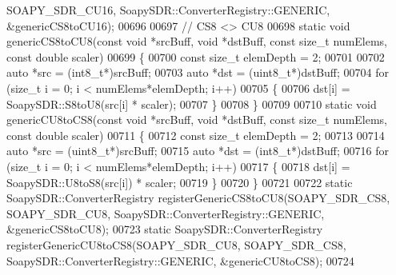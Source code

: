 \begin{DoxyCode}
      SOAPY_SDR_CU16, SoapySDR::ConverterRegistry::GENERIC, &genericCS8toCU16);
00696 
00697 \textcolor{comment}{// CS8 <> CU8}
00698 \textcolor{keyword}{static} \textcolor{keywordtype}{void} genericCS8toCU8(\textcolor{keyword}{const} \textcolor{keywordtype}{void} *srcBuff, \textcolor{keywordtype}{void} *dstBuff, \textcolor{keyword}{const} \textcolor{keywordtype}{size\_t} numElems, \textcolor{keyword}{const} \textcolor{keywordtype}{double} scaler)
00699 \{
00700   \textcolor{keyword}{const} \textcolor{keywordtype}{size\_t} elemDepth = 2;
00701 
00702   \textcolor{keyword}{auto} *src = (int8\_t*)srcBuff;
00703   \textcolor{keyword}{auto} *dst = (uint8\_t*)dstBuff;
00704   \textcolor{keywordflow}{for} (\textcolor{keywordtype}{size\_t} i = 0; i < numElems*elemDepth; i++)
00705     \{
00706       dst[i] = SoapySDR::S8toU8(src[i] * scaler);
00707     \}
00708 \}
00709 
00710 \textcolor{keyword}{static} \textcolor{keywordtype}{void} genericCU8toCS8(\textcolor{keyword}{const} \textcolor{keywordtype}{void} *srcBuff, \textcolor{keywordtype}{void} *dstBuff, \textcolor{keyword}{const} \textcolor{keywordtype}{size\_t} numElems, \textcolor{keyword}{const} \textcolor{keywordtype}{double} scaler)
00711 \{
00712   \textcolor{keyword}{const} \textcolor{keywordtype}{size\_t} elemDepth = 2;
00713 
00714   \textcolor{keyword}{auto} *src = (uint8\_t*)srcBuff;
00715   \textcolor{keyword}{auto} *dst = (int8\_t*)dstBuff;
00716   \textcolor{keywordflow}{for} (\textcolor{keywordtype}{size\_t} i = 0; i < numElems*elemDepth; i++)
00717     \{
00718       dst[i] = SoapySDR::U8toS8(src[i]) * scaler;
00719     \}
00720 \}
00721 
00722 \textcolor{keyword}{static} SoapySDR::ConverterRegistry registerGenericCS8toCU8(SOAPY_SDR_CS8, 
      SOAPY_SDR_CU8, SoapySDR::ConverterRegistry::GENERIC, &genericCS8toCU8);
00723 \textcolor{keyword}{static} SoapySDR::ConverterRegistry registerGenericCU8toCS8(SOAPY_SDR_CU8, 
      SOAPY_SDR_CS8, SoapySDR::ConverterRegistry::GENERIC, &genericCU8toCS8);
00724 
\end{DoxyCode}
